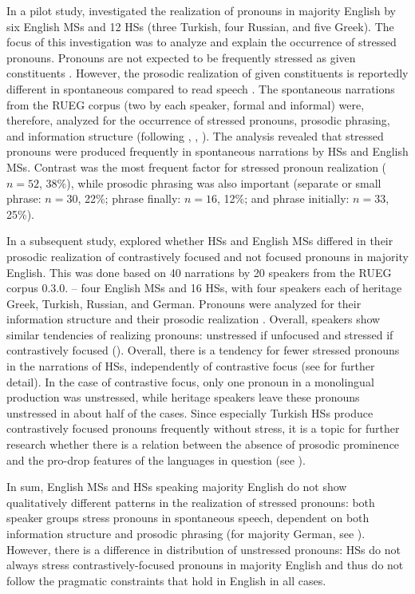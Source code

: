 \documentclass[output=paper,colorlinks,citecolor=brown]{langscibook}
\begin{document}
In a pilot study, \citet{bottcher2020} investigated the realization of pronouns in majority English by six English MSs and 12 HSs (three Turkish, four Russian,  and five Greek). The focus of this investigation was to analyze and explain the occurrence of stressed pronouns.  Pronouns are not expected to be frequently stressed as given constituents \parencite{krifka2008, Selkirk1996}. However, the prosodic realization of given constituents is reportedly different in spontaneous compared to read speech \parencite{DeRuiter2015}. The spontaneous narrations from the RUEG corpus (two by each speaker, formal and informal) were, therefore, analyzed for the occurrence of stressed pronouns, prosodic phrasing, and information structure (following \cite{krifka2008}, \cite{BaumannRiester2013}, \cite{Himmelmann2018}). The analysis revealed that stressed pronouns were produced frequently in spontaneous narrations by HSs and English MSs. Contrast was the most frequent factor for stressed pronoun realization ($n = 52$, 38\%), while prosodic phrasing was also important (separate or small phrase: $n = 30$, 22\%; phrase finally: $n = 16$, 12\%; and phrase initially: $n = 33$, 25\%). 

In a subsequent study, \citet{bottcher2021} explored whether HSs and English MSs differed in their prosodic realization of contrastively focused and not focused pronouns in majority English. This was done based on 40 narrations by 20 speakers from the RUEG corpus 0.3.0. -- four English MSs and 16 HSs, with four speakers each of heritage Greek, Turkish, Russian, and German. Pronouns were analyzed for their information structure \parencite{gotze2007} and their prosodic realization \parencite{beckaman_hirschberg2006, kuglerbaumann2019}. Overall, speakers show similar tendencies of realizing pronouns: unstressed if unfocused and stressed if contrastively focused (). Overall, there is a tendency for fewer stressed pronouns in the narrations of HSs, independently of contrastive focus (see \cite{bottcher2021} for further detail). In the case of contrastive focus, only one pronoun in a monolingual production was unstressed, while heritage speakers leave these pronouns unstressed in about half of the cases. Since especially Turkish HSs produce contrastively focused pronouns frequently without stress, it is a topic for further research whether there is a relation between the absence of prosodic prominence and the pro-drop features of the languages in question (see \cite{chapters/06}).

In sum, English MSs and HSs speaking majority English do not show qualitatively different patterns in the realization of stressed pronouns: both speaker groups stress pronouns in spontaneous speech, dependent on both information structure and prosodic phrasing (for majority German, see \cite{zerbian_boettcher_2019, bottcherschubo2021}). However, there is a difference in distribution of unstressed pronouns: HSs do not always stress contrastively-focused pronouns in majority English and thus do not follow the pragmatic constraints that hold in English in all cases.
\end{document}
